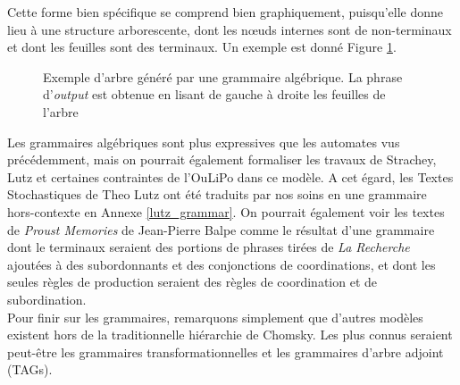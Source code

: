 \documentclass{article}
\begin{document}
				\vspace{2mm}
				Cette forme bien spécifique se comprend bien graphiquement, puisqu'elle donne lieu à une structure arborescente, dont les nœuds internes sont de non-terminaux et dont les feuilles sont des terminaux. Un exemple est donné Figure \ref{fig:ex_syntactic_tree}.
				\begin{figure}
					\centering
					\caption[]{Exemple d'arbre généré par une grammaire algébrique. La phrase d'\textit{output} est obtenue en lisant de gauche à droite les feuilles de l'arbre\footnotemark}
					\label{fig:ex_syntactic_tree}
				\end{figure}
				Les grammaires algébriques sont plus expressives que les automates vus précédemment, mais on pourrait également formaliser les travaux de Strachey, Lutz et certaines contraintes de l'OuLiPo dans ce modèle. A cet égard, les Textes Stochastiques de Theo Lutz ont été traduits par nos soins en une grammaire hors-contexte en Annexe \ref{lutz_grammar}. On pourrait également voir les textes de \textit{Proust Memories} de Jean-Pierre Balpe comme le résultat d'une grammaire dont le terminaux seraient des portions de phrases tirées de \textit{La Recherche} ajoutées à des subordonnants et des conjonctions de coordinations, et dont les seules règles de production seraient des règles de coordination et de subordination.\\
				
				Pour finir sur les grammaires, remarquons simplement que d'autres modèles existent hors de la traditionnelle hiérarchie de Chomsky. Les plus connus seraient peut-être les grammaires transformationnelles \cite{chomsky1979} et les grammaires d'arbre adjoint (TAGs)\cite{joshi1997}.
				
\end{document}

